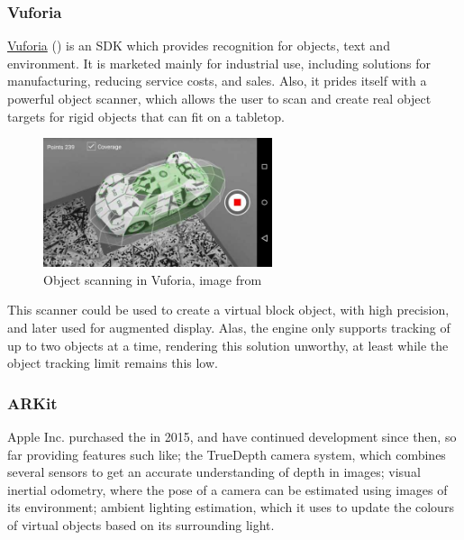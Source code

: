 \subsubsection{Vuforia}
\href{https://www.ptc.com/en/products/augmented-reality}{Vuforia} (\citeyear{vuforia}) is an SDK which provides recognition for objects, text and environment. It is marketed mainly for industrial use, including solutions for manufacturing, reducing service costs, and sales. Also, it prides itself with a powerful object scanner, which allows the user to scan and create real object targets for rigid objects that can fit on a tabletop.

\begin{figure}[ht]
\begin{minipage}{\textwidth}
    \centering
    \includegraphics[width=0.6\textwidth]{images/litreview/vuforiaobject}
    \caption{Object scanning in Vuforia, image from \protect{}}
    \label{fig:vuforia}
\end{minipage}
\end{figure}

This scanner could be used to create a virtual \jenga{} block object, with high precision, and later used for augmented display. Alas, the engine only supports tracking of up to two objects at a time, rendering this solution unworthy, at least while the object tracking limit remains this low.

\subsubsection{ARKit}
Apple Inc. purchased the \citeauthor{arkit} in 2015, and have continued development since then, so far providing features such like; the TrueDepth camera system, which combines several sensors to get an accurate understanding of depth in images; visual inertial odometry, where the pose of a camera can be estimated using images of its environment; ambient lighting estimation, which it uses to update the colours of virtual objects based on its surrounding light.

